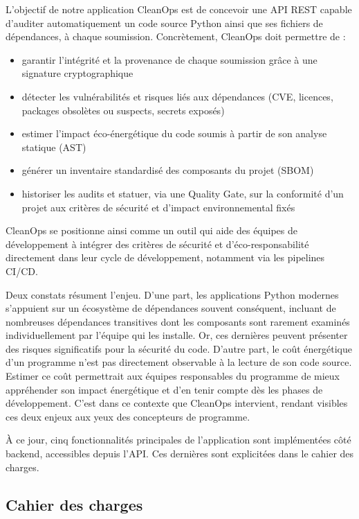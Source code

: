 \documentclass[a4paper,12pt]{article}
\providecommand{\tightlist}{\setlength{\itemsep}{0pt}\setlength{\parskip}{0pt}}
\providecommand{\tightlist}{}
\begin{document}
L'objectif de notre application CleanOps est de concevoir une API REST
capable d'auditer automatiquement un code source Python ainsi que ses
fichiers de dépendances, à chaque soumission. Concrètement, CleanOps
doit permettre de :

\begin{itemize}
\tightlist
\item
  garantir l'intégrité et la provenance de chaque soumission grâce à une
  signature cryptographique
\item
  détecter les vulnérabilités et risques liés aux dépendances (CVE,
  licences, packages obsolètes ou suspects, secrets exposés)
\item
  estimer l'impact éco-énergétique du code soumis à partir de son
  analyse statique (AST)
\item
  générer un inventaire standardisé des composants du projet (SBOM)
\item
  historiser les audits et statuer, via une Quality Gate, sur la
  conformité d'un projet aux critères de sécurité et d'impact
  environnemental fixés \vspace{0.2cm}
\end{itemize}

CleanOps se positionne ainsi comme un outil qui aide des équipes de
développement à intégrer des critères de sécurité et
d'éco-responsabilité directement dans leur cycle de développement,
notamment via les pipelines CI/CD.

Deux constats résument l'enjeu. D'une part, les applications Python
modernes s'appuient sur un écosystème de dépendances souvent conséquent,
incluant de nombreuses dépendances transitives dont les composants sont
rarement examinés individuellement par l'équipe qui les installe. Or,
ces dernières peuvent présenter des risques significatifs pour la
sécurité du code. D'autre part, le coût énergétique d'un programme n'est
pas directement observable à la lecture de son code source. Estimer ce
coût permettrait aux équipes responsables du programme de mieux
appréhender son impact énergétique et d'en tenir compte dès les phases
de développement. C'est dans ce contexte que CleanOps intervient,
rendant visibles ces deux enjeux aux yeux des concepteurs de programme.

À ce jour, cinq fonctionnalités principales de l'application sont
implémentées côté backend, accessibles depuis l'API. Ces dernières sont
explicitées dans le cahier des charges.

\subsection{Cahier des charges}\label{cahier-des-charges}
\end{document}
